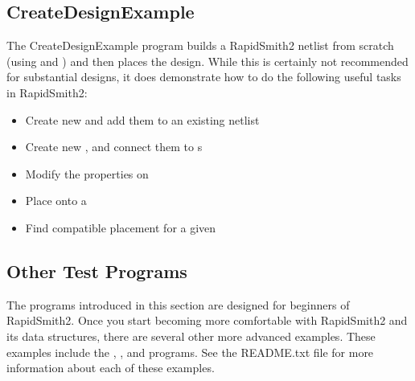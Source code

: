 \subsection{CreateDesignExample} \label{sec:createDesignExample}
The CreateDesignExample program builds a RapidSmith2 netlist from scratch (using
\cells and \cellnets) and then places the design. While this is certainly not
recommended for substantial designs, it does demonstrate how to do the
following useful tasks in RapidSmith2:

\begin{itemize}
  \item Create new \cells and add them to an existing netlist
  \item Create new \cellnets, and connect them to s
  \item Modify the properties on \cells
  \item Place \cells onto a \bels
  \item Find compatible \bel placement for a given \cell
\end{itemize}

\subsection{Other Test Programs}
The programs introduced in this section are designed for beginners of RapidSmith2. Once
you start becoming more comfortable with RapidSmith2 and its data structures,
there are several other more advanced examples. These examples include the
, , and 
programs. See the README.txt file for more information about each of these
examples.
